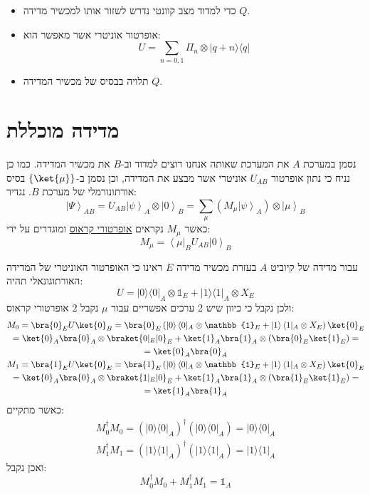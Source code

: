 \documentclass{tstextbook}
\begin{document}
\begin{summary}
  \begin{itemize}
    \item כדי למדוד מצב קוונטי נדרש לשזור אותו למכשיר מדידה \(Q\).
    \item אופרטור אוניטרי אשר מאפשר הוא:
$$U=\sum_{n=0,1}\Pi_{n}\otimes|q+n\rangle\langle q|$$
    \item תלויה בבסיס של מכשיר המדידה \(Q\).
  \end{itemize}
\end{summary}
\section{מדידה מוכללת}

\begin{definition}
נסמן במערכת \(A\) את המערכת שאותה אנחנו רוצים למדוד וב-\(B\) את מכשיר המדידה. כמו כן נניח כי נתון אופרטור \(U_{AB}\) אוניטרי אשר מבצע את המדידה, וכן נסמן ב-\(\left\{  \ket{\mu}  \right\}\) בסיס אורתונורמלי של מערכת \(B\). נגדיר:
$$\left|\Psi\right\rangle_{A B}=U_{A B}\left|\psi\right\rangle_{A}\otimes\left|0\right\rangle_{B}=\sum_{\mu}\left(M_{\mu}\left|\psi\right\rangle_{A}\right)\otimes\left|\mu\right\rangle_{B}$$
כאשר \(M_{\mu}\) נקראים \underline{אופרטורי קראוס} ומוגדרים על ידי:
$$M_{\mu}=\left\langle\mu\right|_{B}U_{A B}\left|0\right\rangle_{B}$$

\end{definition}
\begin{example}
עבור מדידה של קיוביט \(A\) בעזרת מכשיר מדידה \(E\) ראינו כי האופרטור האוניטרי של המדידה האורתוגונאלי תהיה:
$$U=|0\rangle\langle0|_{A}\otimes \mathbb{1}_{E}+|1\rangle\langle1|_{A}\otimes X_{E}$$
ולכן נקבל כי כיוון שיש 2 ערכים אפשריים עבור \(\mu\) נקבל 2 אופרטורי קראוס:
\begin{gather*}M_{0}=\bra{0} _{E}U\ket{0} _{B}=\bra{0}_{E} \left( |0\rangle\left\langle 0|_{A}\otimes \mathbb{1}_{E}+|1 \right\rangle\langle1|_{A}\otimes X_{E} \right)\ket{0} _{E} \\=\ket{0} _{A}\bra{0} _{A}\otimes \braket{ 0 | _{E}|0 }   _{E}+\ket{1} _{A}\bra{1} _{A}\otimes \left( \bra{0} _{E}\ket{1} _{E}  \right)= \\=\ket{0} _{A}\bra{0} _{A} \\M_{1}=\bra{1} _{E}U\ket{0} _{E}=\bra{1}_{E} \left( |0\rangle\left\langle 0|_{A}\otimes \mathbb{1}_{E}+|1 \right\rangle\langle1|_{A}\otimes X_{E} \right)\ket{0} _{E} \\=\ket{0} _{A}\bra{0} _{A}\otimes \braket{ 1 | _{E}|0 }   _{E}+\ket{1} _{A}\bra{1} _{A}\otimes \left( \bra{1} _{E}\ket{1} _{E}  \right)= \\=\ket{1} _{A}\bra{1} _{A}
\end{gather*}
כאשר מתקיים:
\begin{gather*}M_{0}^{\dagger}M_{0}=(|0\rangle\langle0|_{A})^{\dagger}(|0\rangle\langle0|_{A})=|0\rangle\langle0|_{A}\\ M_{1}^{\dagger}M_{1}=(|1\rangle\langle1|_{A})^{\dagger}(|1\rangle\langle1|_{A})=|1\rangle\langle1|_{A} 
\end{gather*}
ואכן נקבל:
$$M_{0}^{\dagger}M_{0}+M_{1}^{\dagger}M_{1}=\mathbb{1} _{A}$$

\end{example}
\end{document}
